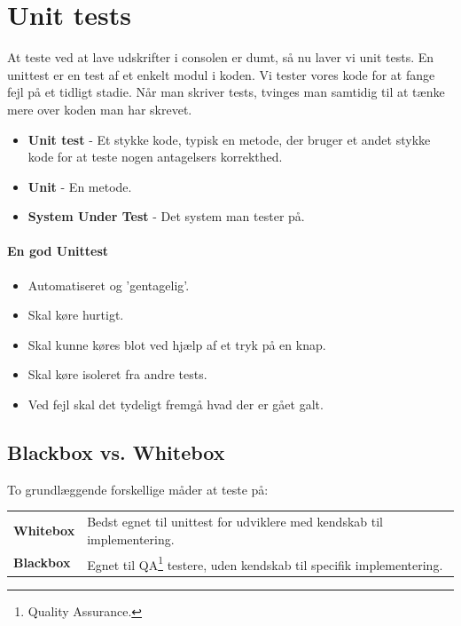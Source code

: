\section{Unit tests}
At teste ved at lave udskrifter i consolen er dumt, så nu laver vi unit tests. En unittest er en test af et enkelt modul i koden. Vi tester vores kode for at fange fejl på et tidligt stadie. Når man skriver tests, tvinges man samtidig til at tænke mere over koden man har skrevet.

\begin{itemize}
	\item \textbf{Unit test} - Et stykke kode, typisk en metode, der bruger et andet stykke kode for at teste nogen antagelsers korrekthed.
	\item \textbf{Unit} - En metode.
	\item \textbf{System Under Test} - Det system man tester på.
\end{itemize}

\paragraph{En god Unittest}
\begin{itemize}
	\item Automatiseret og 'gentagelig'.
	\item Skal køre hurtigt.
	\item Skal kunne køres blot ved hjælp af et tryk på en knap.
	\item Skal køre isoleret fra andre tests.
	\item Ved fejl skal det tydeligt fremgå hvad der er gået galt.
\end{itemize}

\subsection{Blackbox vs. Whitebox}
To grundlæggende forskellige måder at teste på:

\begin{table}[H]
	\begin{tabular}{ll}
		\textbf{Whitebox} & Bedst egnet til unittest for udviklere med kendskab til implementering.\\
		\textbf{Blackbox} & Egnet til QA\footnote{Quality Assurance.} testere, uden kendskab til specifik implementering.\\
	\end{tabular}
\end{table}

